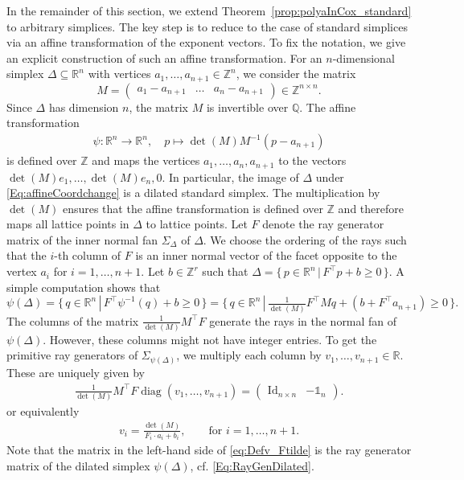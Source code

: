 \documentclass[a4paper,11pt]{amsart}
\theoremstyle{definition}
\DeclareMathOperator{\diag}{diag}
\newcommand{\ZZ}{\mathbb{Z}}
\newcommand{\RR}{\mathbb{R}}
\begin{document}
In the remainder of this section, we extend Theorem~\ref{prop:polyaInCox_standard} to arbitrary simplices. The key step is to reduce to the case of standard simplices via an affine transformation of the exponent vectors.
To fix the notation, we give an explicit construction of such an affine transformation.
For an $n$-dimensional simplex $\Delta \subseteq \mathbb{R}^n$ with vertices $a_1,\dots,a_{n+1} \in \ZZ^n$, we consider the matrix
\[M = \begin{pmatrix}
    a_1 - a_{n+1} & \dots &a_n - a_{n+1}
\end{pmatrix} \in \ZZ^{n \times n}.\]
Since $\Delta$ has dimension $n$, the matrix $M$ is invertible over $\mathbb{Q}$. 
The affine transformation 
\begin{align}
\label{Eq:affineCoordchange}
   \psi\colon \RR^n \to \RR^n, \quad  p \mapsto \det(M)M^{-1}\left(p - a_{n+1} \right)
\end{align}
is defined over $\mathbb{Z}$ and maps the vertices $a_1,\dots,a_n,a_{n+1}$ to the vectors $\det(M)e_1,\dots,\det(M)e_n,0$. In particular, the image of $\Delta$ under \eqref{Eq:affineCoordchange} is a dilated standard simplex.
The multiplication by $\det(M)$ ensures that the affine transformation is defined over $\mathbb{Z}$ and therefore maps all lattice points in $\Delta$ to lattice points. Let $F$ denote the ray generator matrix of the inner normal fan $\Sigma_\Delta$ of $\Delta$. We choose the ordering of the rays such that the $i$-th column of $F$ is an inner normal vector of the facet opposite to the vertex $a_i$ for $i=1,\dots,n+1$.
Let $b \in \ZZ^r$ such that $\Delta = \{ \, p \in \RR^n \, | \, F^\top p + b \geq 0 \, \}$.
   A simple computation shows that 
    \[  \psi(\Delta)  =   \{ \, q \in \RR^n \, | \, F^\top \psi^{-1}(q) + b \geq 0 \, \} = \{ \, q \in \RR^n \, | \, \tfrac{1}{\det(M)} F^\top M q + (b + F^\top a_{n+1}) \geq 0 \, \}.\]
The columns of the matrix $\tfrac{1}{\det(M)} M^\top F$ generate the rays in the normal fan of $\psi(\Delta)$.
However, these columns might not have integer entries. To get the primitive ray generators of $\Sigma_{\psi(\Delta)}$, we multiply each column by $v_1,\dots,v_{n+1} \in \RR$. These are uniquely given by
\begin{align}
\label{eq:Defv_Ftilde}
   \tfrac{1}{\det(M)} M^\top F \diag(v_1,\dots,v_{n+1}) = \begin{pmatrix}
        \mathrm{Id}_{n\times n} & -\mathds{1}_n    \end{pmatrix}.
\end{align}
or equivalently
\begin{align}
\label{eq:Defv}
   v_i = \tfrac{\det(M)}{F_i \cdot a_i + b_i}, \qquad \text{for } i =1,\dots,n+1.
\end{align}
Note that the matrix in the left-hand side of \eqref{eq:Defv_Ftilde} is the ray generator matrix of the dilated simplex $\psi(\Delta)$, cf. \eqref{Eq:RayGenDilated}.
\end{document}
